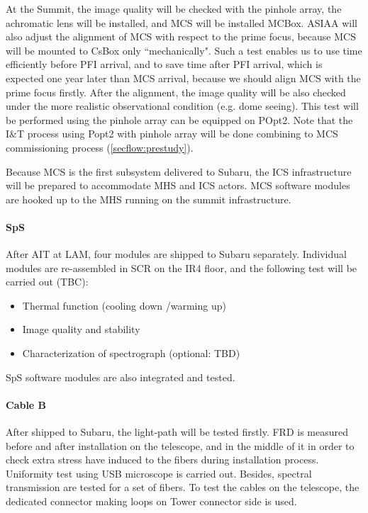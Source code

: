 At the Summit, the image quality will be checked with the pinhole array, the achromatic lens will be installed, and MCS will be installed MCBox.
ASIAA will also adjust the alignment of MCS with respect to the prime focus, because MCS will be mounted to CsBox only ``mechanically".
Such a test enables us to use time efficiently before PFI arrival, and to save time after PFI arrival, which is expected one year later than MCS arrival, because we should align MCS with the prime focus firstly.
After the alignment, the image quality will be also checked under the more realistic observational condition (e.g. dome seeing).
This test will be performed using the pinhole array can be equipped on POpt2.
Note that the I\&T process using Popt2 with pinhole array will be done combining to MCS commissioning process (\ref{secflow:prestudy}).

Because MCS is the first subsystem delivered to Subaru, the ICS infrastructure will be prepared to accommodate MHS and ICS actors.
MCS software modules are hooked up to the MHS running on the summit infrastructure.

\paragraph{SpS}
After AIT at LAM, four modules are shipped to Subaru separately.
Individual modules are re-assembled in SCR on the IR4 floor, and the following test will be carried out (TBC):
\begin{itemize}
\item Thermal function (cooling down /warming up)
\item Image quality and stability
\item Characterization of spectrograph  (optional: TBD)
\end{itemize}

SpS software modules are also integrated and tested.

\paragraph{Cable B}
After shipped to Subaru, the light-path will be tested firstly. 
FRD is measured before and after installation on the telescope, and in the middle of it in order to check extra stress have induced to the fibers during installation process.
Uniformity test using USB microscope is carried out.
Besides, spectral transmission are tested for a set of fibers.
To test the cables on the telescope, the dedicated connector making loops on Tower connector side is used.


